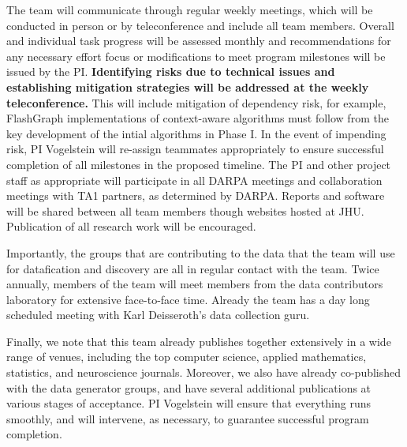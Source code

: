 The team will communicate through regular weekly meetings, which will be conducted in person or by teleconference and include all team members. Overall and individual task progress will be assessed monthly and recommendations for any necessary effort focus or modifications to meet program milestones will be issued by the PI. \textbf{Identifying risks due to technical issues and establishing mitigation strategies will be addressed at the weekly teleconference.} This will include mitigation of dependency risk, for example, FlashGraph implementations of context-aware algorithms must follow from the key development of the intial algorithms in Phase I. In the event of impending risk, PI Vogelstein will re-assign teammates appropriately to ensure successful completion of all milestones in the proposed timeline.  The PI and other project staff as appropriate will participate in all DARPA meetings and collaboration meetings with TA1 partners, as determined by DARPA.  Reports and software will be shared between all team members though websites hosted at JHU. Publication of all research work will be encouraged.

Importantly, the groups that are contributing to the data that the team will use for datafication and discovery are all in regular contact with the team.  Twice annually, members of the team will meet members from the data contributors laboratory for extensive face-to-face time.  Already the team has a day long scheduled meeting with Karl Deisseroth's data collection guru.  

Finally, we note that this team already publishes together extensively in a wide range of venues, including the top computer science, applied mathematics, statistics, and neuroscience journals.  Moreover, we also have already co-published with the data generator groups, and have several additional publications at various stages of acceptance.  PI Vogelstein will ensure that everything runs smoothly, and will intervene, as necessary, to guarantee successful program completion.



